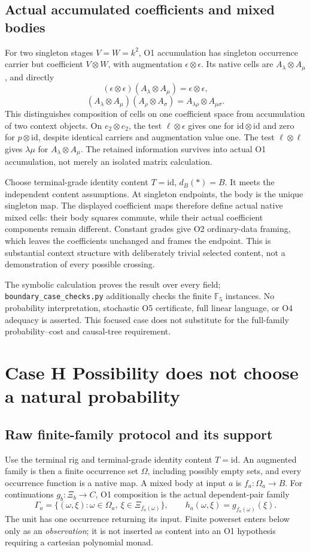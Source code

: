 \documentclass[11pt,a4paper]{article}
\theoremstyle{definition}
\newcommand{\id}{\mathrm{id}}
\begin{document}
\subsection{Actual accumulated coefficients and mixed bodies}
For two singleton stages $V=W=k^2$, O1 accumulation has singleton
occurrence carrier but coefficient $V\otimes W$, with augmentation
$\epsilon\otimes\epsilon$. Its native cells are
$A_\lambda\otimes A_\mu$, and directly
\[
(\epsilon\otimes\epsilon)(A_\lambda\otimes A_\mu)
 =\epsilon\otimes\epsilon,
\]
\[
(A_\lambda\otimes A_\mu)(A_\rho\otimes A_\sigma)
 =A_{\lambda\rho}\otimes A_{\mu\sigma}.
\]
This distinguishes composition of cells on one coefficient space from
accumulation of two context objects. On $e_2\otimes e_2$, the test
$\ell\otimes\epsilon$ gives one for $\id\otimes\id$ and zero for
$p\otimes\id$, despite identical carriers and augmentation value one.
The test $\ell\otimes\ell$ gives $\lambda\mu$ for
$A_\lambda\otimes A_\mu$. The retained information survives into
actual O1 accumulation, not merely an isolated matrix calculation.

Choose terminal-grade identity content $T=\id$, $d_B(*)=B$.
It meets the independent content assumptions. At singleton endpoints,
the body is the unique singleton map. The displayed coefficient maps
therefore define actual native mixed cells: their body squares commute,
while their actual coefficient components remain different. Constant
grades give O2 ordinary-data framing, which leaves the coefficients
unchanged and frames the endpoint. This is substantial context structure
with deliberately trivial selected content, not a demonstration of every
possible crossing.

The symbolic calculation proves the result over every field;
\texttt{boundary\_case\_checks.py} additionally checks the finite
$\mathbb F_5$ instances. No probability interpretation, stochastic O5
certificate, full linear language, or O4 adequacy is asserted. This
focused case does not substitute for the full-family probability--cost
and causal-tree requirement.


\section{Case H Possibility does not choose a natural probability}\label{sec:caseH}

\subsection{Raw finite-family protocol and its support}
Use the terminal rig and terminal-grade identity content $T=\id$.
An augmented family is then a finite occurrence set $\Omega$, including
possibly empty sets, and every occurrence function is a native map.
A mixed body at input $a$ is $f_a:\Omega_a\to B$. For continuations
$g_b:\Xi_b\to C$, O1 composition is the actual dependent-pair family
\[
\Gamma_a=\{(\omega,\xi):\omega\in\Omega_a,
\ \xi\in\Xi_{f_a(\omega)}\},\qquad
h_a(\omega,\xi)=g_{f_a(\omega)}(\xi).
\]
The unit has one occurrence returning its input. Finite powerset enters
below only as an \emph{observation}; it is not inserted as content into
an O1 hypothesis requiring a cartesian polynomial monad.
\end{document}
